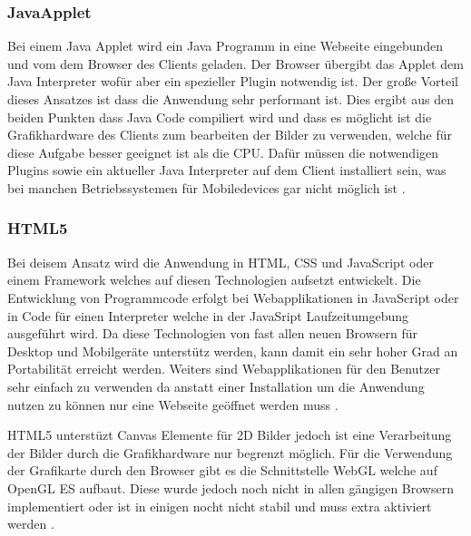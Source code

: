 \subsubsection{JavaApplet}
\label{sec:JavaApplet}
Bei einem Java Applet wird ein Java Programm in eine Webseite eingebunden und vom dem Browser des Clients geladen.
Der Browser übergibt das Applet dem Java Interpreter wofür aber ein spezieller Plugin notwendig ist.
%
Der große Vorteil dieses Ansatzes ist dass die Anwendung sehr performant ist.
Dies ergibt aus den beiden Punkten dass Java Code compiliert wird und dass es möglicht ist die Grafikhardware des Clients zum bearbeiten der Bilder zu verwenden,
welche für diese Aufgabe besser geeignet ist als die CPU.
%
Dafür müssen die notwendigen Plugins sowie ein aktueller Java Interpreter auf dem Client installiert sein, 
was bei manchen Betriebssystemen für Mobiledevices gar nicht möglich ist \cite{japp}.

\subsubsection{HTML5}
\label{sec:HTML5}
Bei deisem Ansatz wird die Anwendung in HTML, CSS und JavaScript oder einem Framework welches auf diesen Technologien aufsetzt entwickelt.
Die Entwicklung von Programmcode erfolgt bei Webapplikationen in JavaScript oder in Code für einen Interpreter welche in der JavaSript Laufzeitumgebung ausgeführt wird.
Da diese Technologien von fast allen neuen Browsern für Desktop und Mobilgeräte unterstütz werden, kann damit ein sehr hoher Grad an Portabilität erreicht werden.
Weiters sind Webapplikationen für den Benutzer sehr einfach zu verwenden da anstatt einer Installation um die Anwendung nutzen zu können nur eine Webseite geöffnet werden muss \cite{html}.

HTML5 unterstüzt Canvas Elemente für 2D Bilder jedoch ist eine Verarbeitung der Bilder durch die Grafikhardware nur begrenzt möglich.
Für die Verwendung der Grafikarte durch den Browser gibt es die Schnittstelle WebGL welche auf OpenGL ES aufbaut.
Diese wurde jedoch noch nicht in allen gängigen Browsern implementiert oder ist in einigen nocht nicht stabil und muss extra aktiviert werden \cite{webgl-14}.


